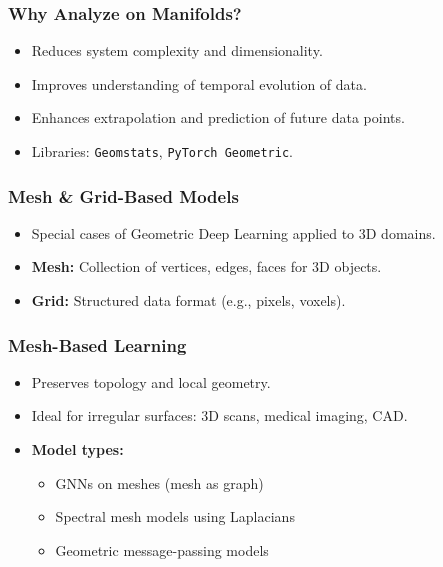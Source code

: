\begin{frame}[fragile]\frametitle{Why Analyze on Manifolds?}
  \begin{itemize}
    \item Reduces system complexity and dimensionality.
    \item Improves understanding of temporal evolution of data.
    \item Enhances extrapolation and prediction of future data points.
    \item Libraries: \texttt{Geomstats}, \texttt{PyTorch Geometric}.
  \end{itemize}
\end{frame}

\begin{frame}[fragile]\frametitle{Mesh \& Grid-Based Models}
  \begin{itemize}
    \item Special cases of Geometric Deep Learning applied to 3D domains.
    \item \textbf{Mesh:} Collection of vertices, edges, faces for 3D objects.
    \item \textbf{Grid:} Structured data format (e.g., pixels, voxels).
  \end{itemize}
\end{frame}

\begin{frame}[fragile]\frametitle{Mesh-Based Learning}
  \begin{itemize}
    \item Preserves topology and local geometry.
    \item Ideal for irregular surfaces: 3D scans, medical imaging, CAD.
    \item \textbf{Model types:}
    \begin{itemize}
      \item GNNs on meshes (mesh as graph)
      \item Spectral mesh models using Laplacians
      \item Geometric message-passing models
    \end{itemize}
  \end{itemize}
\end{frame}

